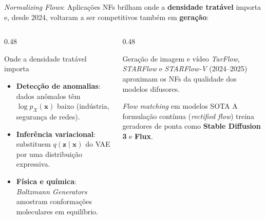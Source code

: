\documentclass[aspectratio=169,xcolor=dvipsnames]{beamer}
\begin{document}
  \begin{frame}{\textit{Normalizing Flows}: Aplicações}
    NFs brilham onde a \textbf{densidade tratável} importa e, desde 2024,
    voltaram a ser competitivos também em \textbf{geração}:
    \vspace{0.3em}
    \begin{columns}[T]
      \begin{column}{0.48\textwidth}
        \begin{block}{Onde a densidade tratável importa}
          \begin{itemize}
            \item \textbf{Detecção de anomalias}: dados anômalos têm
            $\log p_X(\mathbf{x})$ baixo (indústria, segurança de redes).
            \item \textbf{Inferência variacional}: substituem
            $q(\mathbf{z}\mid \mathbf{x})$ do VAE por uma distribuição expressiva.
            \item \textbf{Física e química}: \textit{Boltzmann
            Generators} amostram conformações moleculares em equilíbrio.
          \end{itemize}
        \end{block}
      \end{column}
      \begin{column}{0.48\textwidth}
        \begin{block}{Geração de imagem e vídeo}
          \textit{TarFlow}, \textit{STARFlow} e \textit{STARFlow-V}
          (2024--2025) aproximam os NFs da qualidade dos modelos
          difusores.
        \end{block}
        \begin{block}{\textit{Flow matching} em modelos SOTA}
          A formulação contínua (\textit{rectified flow}) treina geradores
          de ponta como \textbf{Stable Diffusion 3} e \textbf{Flux}.
        \end{block}
      \end{column}
    \end{columns}
  \end{frame}
\end{document}
